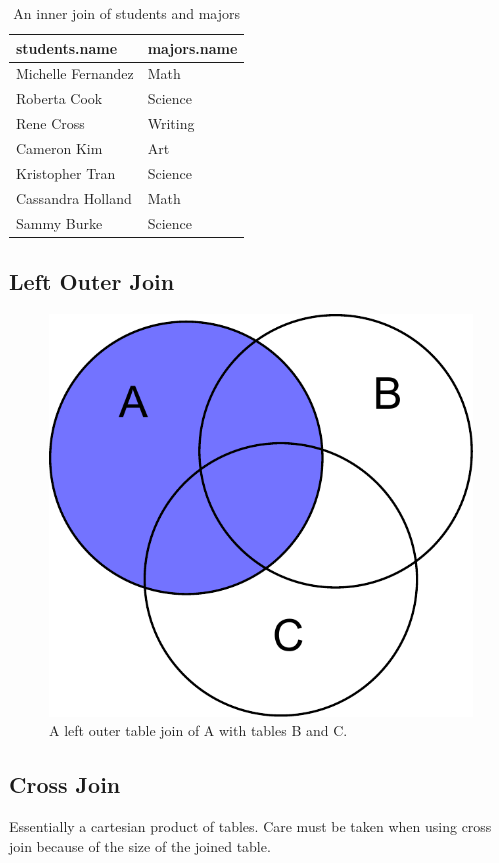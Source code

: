 \begin{table}
\begin{tabular}{|l|l|}
\hline
students.name & majors.name \\
\hline
Michelle Fernandez & Math \\
Roberta Cook & Science \\
Rene Cross & Writing \\
Cameron Kim & Art \\
Kristopher Tran & Science \\
Cassandra Holland & Math \\
Sammy Burke & Science \\
\hline
\end{tabular}
\caption{An inner join of students and majors}
\label{table:ij_studentsmajors}
\end{table}

\subsection*{Left Outer Join}

\begin{figure}
\centering
\includegraphics[width=.5\textwidth]{left_outer.pdf}
\caption{A left outer table join of A with tables B and C.}
\label{fig:left_outer}
\end{figure}




\subsection*{Cross Join}
Essentially a cartesian product of tables.  Care must be taken when using cross join because of the size of the joined table.



